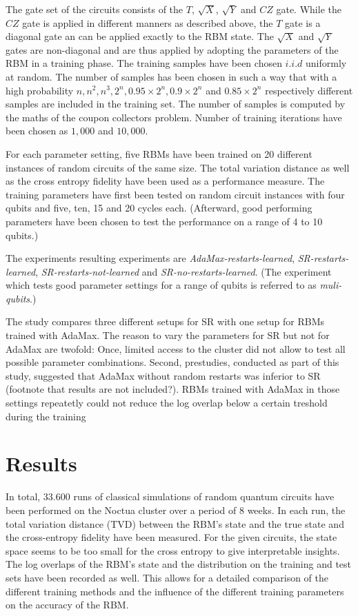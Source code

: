 The gate set of the circuits consists of the $T$, $\sqrt{X}$, $\sqrt{Y}$ and $CZ$ gate. While the $CZ$ gate is 
applied in different manners as described above, the $T$ gate is a diagonal gate an can be applied exactly to the RBM state.
The $\sqrt{X}$ and $\sqrt{Y}$ gates are non-diagonal and are thus applied by adopting the parameters of the RBM in 
a training phase. The training samples have been chosen $i.i.d$ uniformly at random. The number of samples has been chosen 
in such a way that with a high probability $n, n^2, n^3, 2^n, 0.95 \times 2^n, 0.9 \times 2^n$ and $0.85 \times 2^n$ 
respectively different samples are included in the training set. The number of samples is computed by the maths of the coupon collectors problem.
Number of training iterations have been chosen as $1,000$ and $10,000$.

For each parameter setting, five RBMs have been trained on 20 different instances of random circuits of the same 
size. The total variation distance as well as the cross entropy fidelity have been used as a performance measure.
The training parameters have first been tested on random circuit instances with four qubits and 
five, ten, 15 and 20 cycles each. (Afterward, good performing parameters have been chosen to test 
the performance on a range of 4 to 10 qubits.)

The experiments resulting experiments are \textit{AdaMax-restarts-learned}, \textit{SR-restarts-learned}, 
\textit{SR-restarts-not-learned} and \textit{SR-no-restarts-learned}. (The experiment which 
tests good parameter settings for a range of qubits is referred to as \textit{muli-qubits}.)

The study compares three different setups for SR with one setup for RBMs trained with 
AdaMax. The reason to vary the parameters for SR but not for AdaMax are twofold:
Once, limited access to the cluster did not allow to test all possible parameter combinations. Second,
prestudies, conducted as part of this study, suggested that AdaMax without random restarts 
was inferior to SR (footnote that results are not included?). RBMs trained with AdaMax in those settings repeatetly could not reduce the 
log overlap below a certain treshold during the training

\section{Results}

In total, 33.600 runs of classical simulations of random quantum circuits have been performed 
on the Noctua cluster over a period of 8 weeks. In each run, the total variation distance (TVD)
between the RBM's state and the true state and the cross-entropy fidelity have been measured. For the given circuits, the state space seems to be too small 
for the cross entropy to give interpretable insights.
 The log overlaps of the RBM's state and the distribution on the training and test sets have been recorded as well. This allows for a detailed comparison
of the different training methods and the influence of the different training parameters on the 
accuracy of the RBM.

